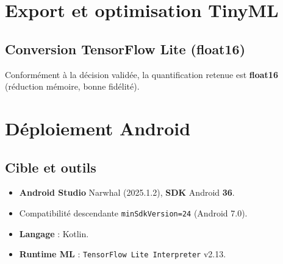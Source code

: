 \section{Export et optimisation TinyML}
\label{sec:optim_tinyml}

\subsection{Conversion TensorFlow Lite (float16)}
Conformément à la décision validée, la quantification retenue est \textbf{float16} (réduction mémoire, bonne fidélité). 



\section{Déploiement Android}
\label{sec:deploiement_android}

\subsection{Cible et outils}
\begin{itemize}
    \item \textbf{Android Studio} Narwhal (2025.1.2), \textbf{SDK} Android \textbf{36}.
    \item Compatibilité descendante \texttt{minSdkVersion=24} (Android 7.0).
    \item \textbf{Langage} : Kotlin.
    \item \textbf{Runtime ML} : \texttt{TensorFlow Lite Interpreter} v2.13.
\end{itemize}

